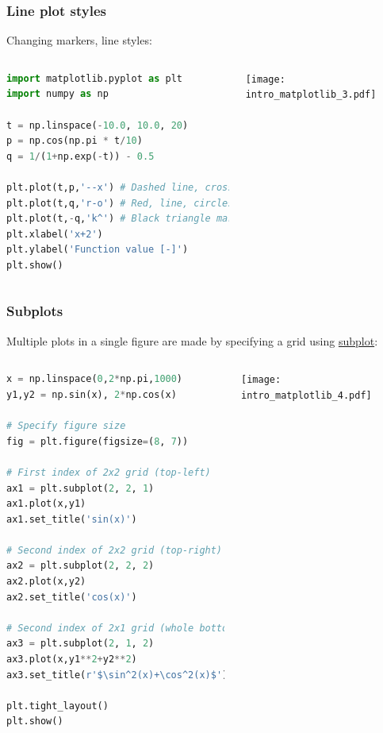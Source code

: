 \begin{frame}[fragile]
  \frametitle{Line plot styles}
  Changing markers, line styles:
  \begin{columns}
    \begin{lstlisting}[language=Python]
import matplotlib.pyplot as plt
import numpy as np

t = np.linspace(-10.0, 10.0, 20)
p = np.cos(np.pi * t/10) 
q = 1/(1+np.exp(-t)) - 0.5

plt.plot(t,p,'--x') # Dashed line, cross
plt.plot(t,q,'r-o') # Red, line, circles
plt.plot(t,-q,'k^') # Black triangle marker
plt.xlabel('x+2')
plt.ylabel('Function value [-]')
plt.show()
    \end{lstlisting}\pause
      \texttt{[image: intro\_matplotlib\_3.pdf]}
  \end{columns}
\end{frame}

{\nologo
\begin{frame}[fragile]
  \frametitle{Subplots}
  Multiple plots in a single figure are made by specifying a grid using \href{https://matplotlib.org/stable/api/_as_gen/matplotlib.pyplot.subplot.html#matplotlib-pyplot-subplot}{subplot}:
  \begin{columns}
    \begin{lstlisting}[language=Python]
x = np.linspace(0,2*np.pi,1000)
y1,y2 = np.sin(x), 2*np.cos(x)

# Specify figure size
fig = plt.figure(figsize=(8, 7))

# First index of 2x2 grid (top-left)
ax1 = plt.subplot(2, 2, 1) 
ax1.plot(x,y1)
ax1.set_title('sin(x)')

# Second index of 2x2 grid (top-right)
ax2 = plt.subplot(2, 2, 2) 
ax2.plot(x,y2)
ax2.set_title('cos(x)')

# Second index of 2x1 grid (whole bottom)
ax3 = plt.subplot(2, 1, 2) 
ax3.plot(x,y1**2+y2**2)
ax3.set_title(r'$\sin^2(x)+\cos^2(x)$')

plt.tight_layout()
plt.show()
    \end{lstlisting}\pause
      \texttt{[image: intro\_matplotlib\_4.pdf]}
  \end{columns}
\end{frame}
}

